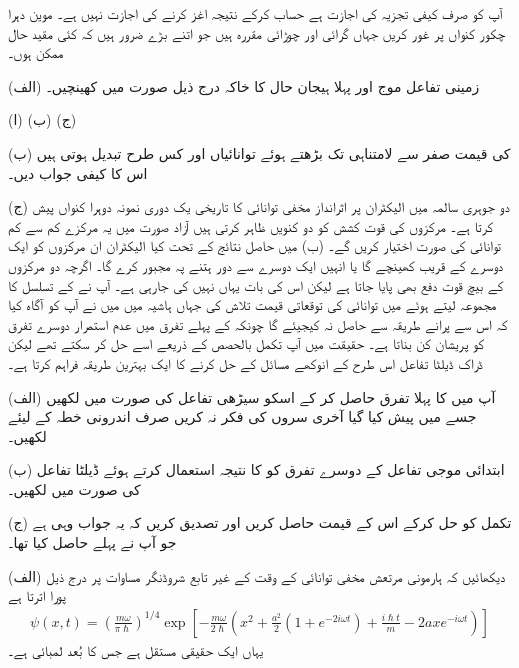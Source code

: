 
آپ کو صرف کیفی تجزیہ کی اجازت ہے حساب کرکے نتیجہ اغز کرنے کی اجازت نہیں ہے۔  موین دہرا چکور کنواں پر غور کریں جہاں گرائی  اور چوڑائی  مقررہ ہیں جو اتنے بڑے ضرور ہیں کہ کئی مقید حال ممکن ہوں۔

(الف) زمینی تفاعل موج  اور پہلا ہیجان حال  کا خاکہ درج ذیل صورت میں کھینچیں۔

(ا)  (ب)  (ج) 

(ب)  کی قیمت صفر سے لامتناہی تک بڑھتے ہوئے توانائیاں  اور  کس طرح تبدیل ہوتی ہیں اس کا کیفی جواب دیں۔

(ج) دو جوہری سالمہ میں الیکٹران پر اثرانداز مخفی توانائی کا تاریخی یک دوری نمونہ دوہرا کنواں پیش کرتا ہے۔ مرکزوں کی قوت کشش کو دو کنویں ظاہر کرتی ہیں آزاد صورت میں یہ مرکزے کم سے کم توانائی کی صورت اختیار کریں گے۔ (ب) میں حاصل نتائج کے تحت کیا الیکٹران ان مرکزوں کو ایک دوسرے کے قریب کھینچے گا یا انہیں ایک دوسرے سے دور ہتنے پہ مجبور کرے گا۔ اگرچہ دو مرکزوں کے بیچ قوت دفع بھی پایا جاتا ہے لیکن اس کی بات یہاں نہیں کی جارہی ہے۔
آپ نے  کے تسلسل کا مجموعہ لیتے ہوئے  میں توانائی کی توقعاتی قیمت تلاش کی جہاں ہاشیہ میں میں نے آپ کو آگاہ کیا کہ اس سے پرانے طریقہ  سے حاصل نہ کیجیئے گا چونکہ  کے پہلے تفرق میں عدم استمرار دوسرے تفرق کو پریشان کن بناتا ہے۔ حقیقت میں آپ تکمل بالحصص کے ذریعے اسے حل کر سکتے تھے لیکن ڈراک ڈیلٹا تفاعل اس طرح کے انوکھے مسائل کے حل کرنے کا ایک بہترین طریقہ فراہم کرتا ہے۔

(الف) آپ  میں  کا پہلا تفرق حاصل کر کے اسکو سیڑھی تفاعل  کی صورت میں لکھیں جسے  میں پیش کیا گیا آخری سروں کی فکر نہ کریں صرف اندرونی خطہ  کے لیئے لکھیں۔

(ب) ابتدائی موجی تفاعل  کے دوسرے تفرق کو  کا نتیجہ استعمال کرتے ہوئے ڈیلٹا تفاعل کی صورت میں لکھیں۔

(ج) تکمل  کو حل کرکے اس کے قیمت حاصل کریں اور تصدیق کریں کہ یہ جواب وہی ہے جو آپ نے پہلے حاصل کیا تھا۔

(الف) دیکھائیں کہ ہارمونی مرتعش مخفی توانائی کے وقت کے غیر تابع شروڈنگر مساوات  پر درج ذیل پورا اترتا ہے
\begin{align*}
	\psi(x, t)=\left(\frac{m\omega}{\pi\hslash}\right)^{1/4}\exp\left[-\frac{m\omega}{2\hslash}\left(x^2+\frac{a^2}{2}(1+e^{-2i\omega t})+\frac{i\hslash t}{m}-2axe^{-i\omega t}\right)\right]
\end{align*}
یہاں  ایک حقیقی مستقل ہے جس کا بُعد لمبائی ہے۔

